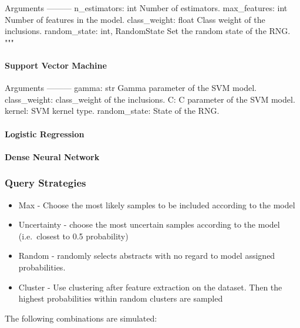 \documentclass[
]{article}
\providecommand{\tightlist}{%
  \setlength{\itemsep}{0pt}\setlength{\parskip}{0pt}}
\begin{document}
Arguments --------- n\_estimators: int Number of estimators.
max\_features: int Number of features in the model. class\_weight: float
Class weight of the inclusions. random\_state: int, RandomState Set the
random state of the RNG. """

\hypertarget{support-vector-machine}{%
\paragraph{Support Vector Machine}\label{support-vector-machine}}

Arguments --------- gamma: str Gamma parameter of the SVM model.
class\_weight: class\_weight of the inclusions. C: C parameter of the
SVM model. kernel: SVM kernel type. random\_state: State of the RNG.

\hypertarget{logistic-regression}{%
\paragraph{Logistic Regression}\label{logistic-regression}}

\hypertarget{dense-neural-network}{%
\paragraph{\texorpdfstring{\textbf{Dense Neural
Network}}{Dense Neural Network}}\label{dense-neural-network}}

\hypertarget{query-strategies}{%
\subsubsection{Query Strategies}\label{query-strategies}}

\begin{itemize}
\tightlist
\item
  Max - Choose the most likely samples to be included according to the
  model
\item
  Uncertainty - choose the most uncertain samples according to the model
  (i.e.~closest to 0.5 probability) \autocite{Lewis1994}
\item
  Random - randomly selects abstracts with no regard to model assigned
  probabilities.
\item
  Cluster - Use clustering after feature extraction on the dataset. Then
  the highest probabilities within random clusters are sampled
\end{itemize}

The following combinations are simulated:
\end{document}
